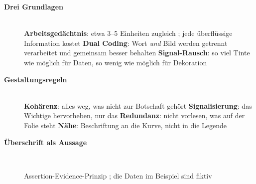 \begin{description}
\item[{\rot\bf Drei Grundlagen}]~\\[-\lblskip]
\bi
  \ite \textbf{Arbeitsgedächtnis}: etwa 3--5 Einheiten zugleich
    \parencite{cowan2001magical}; jede überflüssige Information kostet
    \parencite{sweller1988cognitive}
  \ite \textbf{Dual Coding}: Wort \emph{und} Bild werden getrennt verarbeitet
    und gemeinsam besser behalten \parencite{paivio1986mental}
  \ite \textbf{Signal-Rausch}: so viel Tinte wie möglich für Daten, so
    wenig wie möglich für Dekoration \parencite{tufte2001visual}
\ei
\os{\newpage}

\item[{\rot\bf Gestaltungsregeln}]~\\[-\lblskip]
\bi
  \ite \textbf{Kohärenz}: alles weg, was nicht zur Botschaft gehört
  \ite \textbf{Signalisierung}: das Wichtige hervorheben, nur das
  \ite \textbf{Redundanz}: nicht vorlesen, was auf der Folie steht
  \ite \textbf{Nähe}: Beschriftung an die Kurve, nicht in die Legende
  \ite \parencite{mayer2009multimedia}
\ei
\os{\newpage}

\item[{\rot\bf Überschrift als Aussage}]~\\[-\lblskip]
\begin{center}
\end{center}
\bi
  \ite Assertion-Evidence-Prinzip \parencite{alley2013craft}; die Daten
    im Beispiel sind fiktiv
\ei
\os{\newpage}
\end{description}


